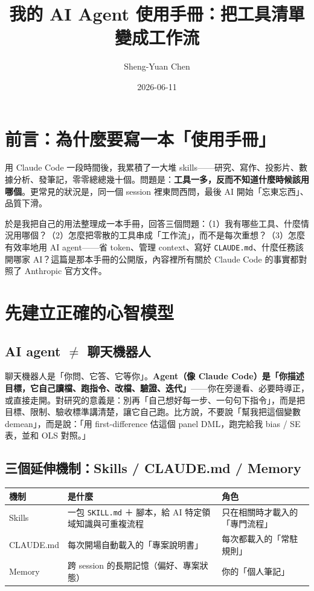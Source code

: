 \documentclass[12pt, a4paper]{article}
\title{我的 AI Agent 使用手冊：把工具清單變成工作流}
\author{Sheng-Yuan Chen}
\date{2026-06-11}
\begin{document}
\maketitle

\section{前言：為什麼要寫一本「使用手冊」}

用 Claude Code 一段時間後，我累積了一大堆 skills——研究、寫作、投影片、數據分析、發筆記，零零總總幾十個。問題是：\textbf{工具一多，反而不知道什麼時候該用哪個}。更常見的狀況是，同一個 session 裡東問西問，最後 AI 開始「忘東忘西」、品質下滑。

於是我把自己的用法整理成一本手冊，回答三個問題：（1）我有哪些工具、什麼情況用哪個？（2）怎麼把零散的工具串成「工作流」，而不是每次重想？（3）怎麼有效率地用 AI agent——省 token、管理 context、寫好 \texttt{CLAUDE.md}、什麼任務該開哪家 AI？這篇是那本手冊的公開版，內容裡所有關於 Claude Code 的事實都對照了 Anthropic 官方文件。

\section{先建立正確的心智模型}

\subsection{AI agent $\neq$ 聊天機器人}

聊天機器人是「你問、它答、它等你」。\textbf{Agent（像 Claude Code）是「你描述目標，它自己讀檔、跑指令、改檔、驗證、迭代」}——你在旁邊看、必要時導正，或直接走開。對研究的意義是：別再「自己想好每一步、一句句下指令」，而是把目標、限制、驗收標準講清楚，讓它自己跑。比方說，不要說「幫我把這個變數 demean」，而是說：「用 first-difference 估這個 panel DML，跑完給我 bias / SE 表，並和 OLS 對照。」

\subsection{三個延伸機制：Skills / CLAUDE.md / Memory}

\begin{table}[h]
\centering
\begin{tabularx}{\linewidth}{lYY}
\toprule
機制 & 是什麼 & 角色 \\
\midrule
Skills & 一包 \texttt{SKILL.md} ＋ 腳本，給 AI 特定領域知識與可重複流程 & 只在相關時才載入的「專門流程」 \\
CLAUDE.md & 每次開場自動載入的「專案說明書」 & 每次都載入的「常駐規則」 \\
Memory & 跨 session 的長期記憶（偏好、專案狀態） & 你的「個人筆記」 \\
\bottomrule
\end{tabularx}
\end{table}
\end{document}
